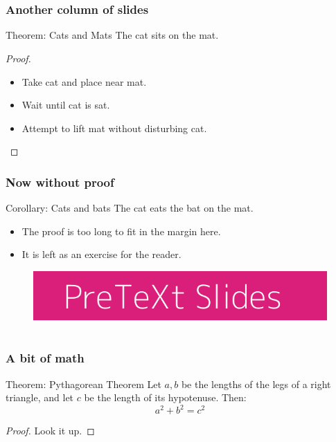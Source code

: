 \documentclass[11pt, compress]{beamer}
\begin{document}
\section{}
\begin{frame}
\frametitle{Another column of slides}
 \begin{theorem}{Theorem: Cats and Mats}
The cat sits on the mat.\end{theorem}
\begin{proof}
\pause 
\begin{itemize}[<+->]
\item{}
Take cat and place near mat.

\item{}
Wait until cat is sat.

\item{}
Attempt to lift mat without disturbing cat.
\end{itemize}\end{proof}\end{frame}
 
\begin{frame}
\frametitle{Now without proof}
 \begin{theorem}{Corollary: Cats and bats}
The cat eats the bat on the mat.\end{theorem}
 
\pause 
\begin{itemize}[<+->]
\item{}
The proof is too long to fit in the margin here.

\item{}
It is left as an exercise for the reader.
\end{itemize} \begin{figure}\centering\includegraphics[width=1\linewidth]{img/600x100-d91f79.png}
\end{figure}\end{frame}
 


\section{}
\begin{frame}
\frametitle{A bit of math}
 \begin{theorem}{Theorem: Pythagorean Theorem}
Let \(a,b\) be the lengths of the legs of a right triangle, and let \(c\) be the length of its hypotenuse. Then:%
\begin{equation*}
a^2+b^2=c^2
\end{equation*}
\end{theorem}
\begin{proof}
Look it up.\end{proof}\end{frame}
 
\end{document}
